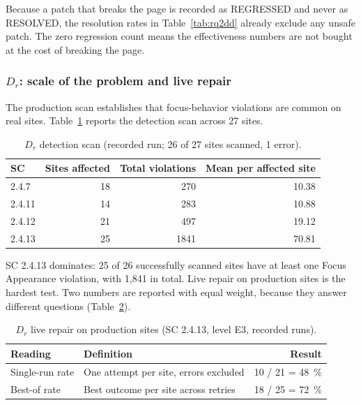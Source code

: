 \documentclass[11pt]{article}
\newcommand{\Dr}{\ensuremath{D_r}}
\begin{document}
Because a patch that breaks the page is recorded as REGRESSED and never as RESOLVED,
the resolution rates in Table~\ref{tab:rq2dd} already exclude any unsafe patch. The
zero regression count means the effectiveness numbers are not bought at the cost of
breaking the page.

\subsubsection{\Dr: scale of the problem and live repair}

The production scan establishes that focus-behavior violations are common on real
sites. Table~\ref{tab:drdetect} reports the detection scan across 27 sites.

\begin{table}[h]
\centering
\caption{\Dr{} detection scan (recorded run; 26 of 27 sites scanned, 1 error).}
\label{tab:drdetect}
\begin{tabular}{lrrr}
\toprule
SC & Sites affected & Total violations & Mean per affected site \\
\midrule
2.4.7 & 18 & 270 & 10.38 \\
2.4.11 & 14 & 283 & 10.88 \\
2.4.12 & 21 & 497 & 19.12 \\
2.4.13 & 25 & 1841 & 70.81 \\
\bottomrule
\end{tabular}
\end{table}

SC 2.4.13 dominates: 25 of 26 successfully scanned sites have at least one Focus
Appearance violation, with 1{,}841 in total. Live repair on production sites is the
hardest test. Two numbers are reported with equal weight, because they answer
different questions (Table~\ref{tab:drrepair}).

\begin{table}[h]
\centering
\caption{\Dr{} live repair on production sites (SC 2.4.13, level E3, recorded runs).}
\label{tab:drrepair}
\begin{tabular}{p{2.6cm}p{6.5cm}r}
\toprule
Reading & Definition & Result \\
\midrule
Single-run rate & One attempt per site, errors excluded & 10 / 21 = \SI{48}{\percent} \\
Best-of rate & Best outcome per site across retries & 18 / 25 = \SI{72}{\percent} \\
\bottomrule
\end{tabular}
\end{table}
\end{document}
